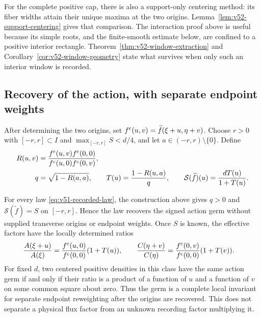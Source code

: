 For the complete positive cap, there is also a support-only centering
method: its fiber widths attain their unique maxima at the two origins.
Lemma~\ref{lem:v52-support-centering} gives that comparison.  The
interaction proof above is useful because its simple roots, and the
finite-smooth estimate below, are confined to a positive interior rectangle.
Theorem~\ref{thm:v52-window-extraction} and
Corollary~\ref{cor:v52-window-geometry} state what survives when only
such an interior window is recorded.

\subsection{Recovery of the action, with separate endpoint weights}

After determining the two origins, set
$f^{\rm c}(u,v)=\widetilde f(\xi+u,\eta+v)$.  Choose $r>0$ with
$[-r,r]\subset I$ and $\max_{[-r,r]}S<d/4$, and let
$a\in(-r,r)\setminus\{0\}$.  Define
\begin{align}
 R(u,v)&=\frac{f^{\rm c}(u,v)f^{\rm c}(0,0)}
                   {f^{\rm c}(u,0)f^{\rm c}(0,v)},
                      \label{eq:v51-centered-ratio}\\
 q&=\sqrt{1-R(a,a)},\qquad
 T(u)=\frac{1-R(u,a)}{q},\qquad
 \mathcal S(\widetilde f)(u)=\frac{dT(u)}{1+T(u)}.
                      \label{eq:v51-centered-inverse}
\end{align}

\begin{theorem}
\label{thm:v51-action}
For every law \eqref{eq:v51-recorded-law}, the construction above gives
$q>0$ and $\mathcal S(\widetilde f)=S$ on $[-r,r]$.  Hence the law
recovers the signed action germ without supplied transverse origins or
endpoint weights.  Once $S$ is known, the effective factors have the
locally determined ratios
\begin{align}
 \frac{A(\xi+u)}{A(\xi)}
   &=\frac{f^{\rm c}(u,0)}{f^{\rm c}(0,0)}(1+T(u)),
 \qquad
 \frac{C(\eta+v)}{C(\eta)}
   =\frac{f^{\rm c}(0,v)}{f^{\rm c}(0,0)}(1+T(v)).
                         \label{eq:v51-effective-weights}
\end{align}
For fixed $d$, two centered positive densities in this class have the same
action germ if and only if their ratio is a product of a function of $u$
and a function of $v$ on some common square about zero.  Thus the germ is
a complete local invariant for separate endpoint reweighting after the
origins are recovered.  This does not separate a physical flux factor
from an unknown recording factor multiplying it.
\end{theorem}

